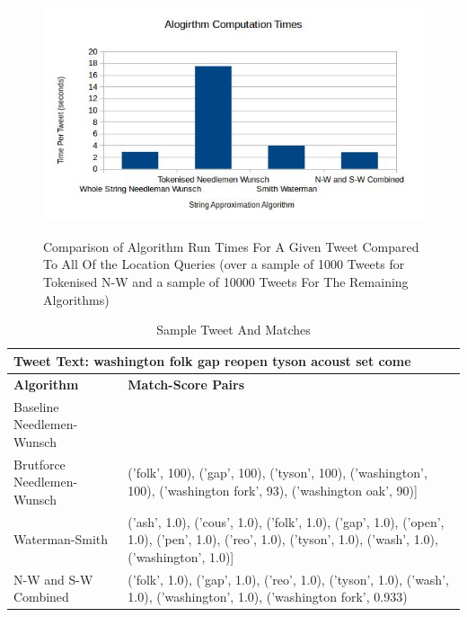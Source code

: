 \documentclass[11pt,a4paper]{article}
\begin{document}
\begin{figure}[ht]
	\centering
	\includegraphics[scale=0.8]{times1.jpg}
	\label{fig:times-graph}
	\caption{Comparison of Algorithm Run Times For A Given Tweet Compared To All Of the Location Queries (over a sample of 1000 Tweets for Tokenised N-W and a sample of 10000 Tweets For The Remaining Algorithms)}
\end{figure}

\begin{table} [t]
\caption{Sample Tweet And Matches}
\begin{center}
	\begin{tabular}{| p{5.5cm} | p{10cm} |}
	\hline
	\multicolumn{2}{|p{15.5cm}|}{\textbf{Tweet Text:} washington folk gap reopen tyson acoust set come } \\
	\hline
	\textbf{Algorithm} & \textbf{Match-Score Pairs}\\
	\hline
	Baseline Needlemen-Wunsch & \\
	\hline
	Brutforce Needlemen-Wunsch & ('folk', 100), ('gap', 100), ('tyson', 100), ('washington', 100), ('washington fork', 93), ('washington oak', 90)]\\
	\hline
	Waterman-Smith & ('ash', 1.0), ('cous', 1.0), ('folk', 1.0), ('gap', 1.0), ('open', 1.0), ('pen', 1.0), ('reo', 1.0), ('tyson', 1.0), ('wash', 1.0), ('washington', 1.0)]\\
	\hline
	N-W and S-W Combined & ('folk', 1.0), ('gap', 1.0), ('reo', 1.0), ('tyson', 1.0), ('wash', 1.0), ('washington', 1.0), ('washington fork', 0.933)\\
	\hline
	\end{tabular}
\end{center}
\label{table:alg-table1}
\end{table}
\end{document}
